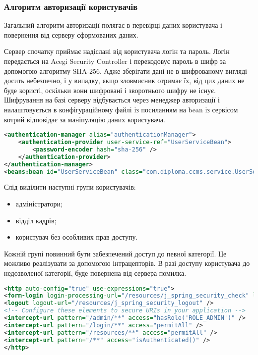 \subsubsection{Алгоритм авторизації користувачів}
Загальний алгоритм авторизації полягає в перевірці даних користувача і повернення від серверу сформованих даних.
\par Сервер спочатку приймає надіслані від користувача логін та пароль. Логін передається на Acegi Security Controller і перекодовує пароль в шифр за допомогою алгоритму SHA-256. Адже зберігати дані не в шифрованому вигляді досить небезпечно, і у випадку, якщо зловмисник отримає їх, від цих даних не буде користі, оскільки вони шифровані і зворотнього шифру не існує. Шифрування на базі серверу відбувається через менеджер авторизації і налаштовується в конфігураційному файлі із посиланням на bean із сервісом котрий відповідає за маніпуляцію даних користувача.

\begin{lstlisting}[language=Xml]
<authentication-manager alias="authenticationManager">
	<authentication-provider user-service-ref="UserServiceBean">
		<password-encoder hash="sha-256" />
	</authentication-provider>
</authentication-manager>
<beans:bean id="UserServiceBean" class="com.diploma.ccms.service.UserService" />
\end{lstlisting}

Слід виділити наступні групи користувачів:
\begin{itemize}
	\item адміністратори;
	\item відділ кадрів;
	\item користувач без особливих прав доступу.
\end{itemize}

\par Кожній групі повинний бути забезпечений доступ до певної категорії. Це можливо реалізувати за допомогою інтрацепторів. В разі доступу користувача до недозволеної категорії, буде повернена від сервера помилка.

\begin{lstlisting}[language=Xml]
<http auto-config="true" use-expressions="true">
<form-login login-processing-url="/resources/j_spring_security_check" login-page="/login" authentication-failure-url="/login?login_error=t" />
<logout logout-url="/resources/j_spring_security_logout" />
<!-- Configure these elements to secure URIs in your application -->
<intercept-url pattern="/admin/**" access="hasRole('ROLE_ADMIN')" />
<intercept-url pattern="/login/**" access="permitAll" />
<intercept-url pattern="/resources/**" access="permitAll" />
<intercept-url pattern="/**" access="isAuthenticated()" />
</http>
\end{lstlisting}


